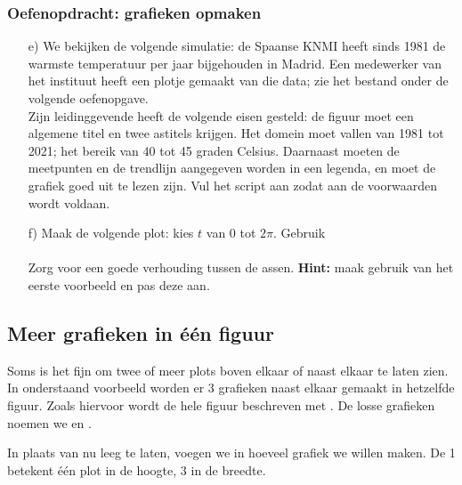 \documentclass[a4paper,11pt, fleqn]{article}
\begin{document}
\subsubsection*{Oefenopdracht: grafieken opmaken}
\begin{itemize}
	\item[e)] We bekijken de volgende simulatie: de Spaanse KNMI heeft sinds 1981 de warmste temperatuur per jaar bijgehouden in Madrid. Een medewerker van het instituut heeft een plotje gemaakt van die data; zie het bestand onder de volgende oefenopgave. \\
	Zijn leidinggevende heeft de volgende eisen gesteld: de figuur moet een algemene titel en twee astitels krijgen. Het domein moet vallen van 1981 tot 2021; het bereik van 40 tot 45 graden Celsius. Daarnaast moeten de meetpunten en de trendlijn aangegeven worden in een legenda, en moet de grafiek goed uit te lezen zijn. Vul het script aan zodat aan de voorwaarden wordt voldaan.
	
	\item[f)] Maak de volgende plot: kies $t$ van $0$ tot $2\pi$. Gebruik
	\\
	\\
	 Zorg voor een goede verhouding tussen de assen.
	 {\bf Hint:} maak gebruik van het eerste voorbeeld en pas deze aan.
\end{itemize}


\subsection{Meer grafieken in \'e\'en figuur}
Soms is het fijn om twee of meer plots boven elkaar of naast elkaar te laten zien. In onderstaand voorbeeld worden er 3 grafieken naast elkaar gemaakt in hetzelfde figuur. Zoals hiervoor wordt de hele figuur beschreven met . De losse grafieken noemen we  en . 

In plaats van  nu leeg te laten, voegen we in hoeveel grafiek we willen maken. De 1 betekent \'e\'en plot in de hoogte, 3 in de breedte.
\end{document}
